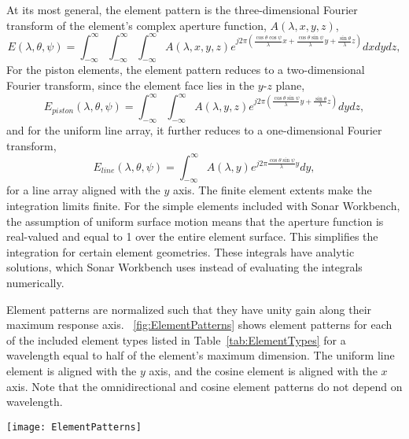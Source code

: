 At its most general, the element pattern is the three-dimensional Fourier transform of the element's complex aperture function, $A(\lambda,x,y,z)$,
\begin{equation}
E(\lambda,\theta,\psi) = \int_{-\infty}^\infty\int_{-\infty}^\infty\int_{-\infty}^\infty A(\lambda,x,y,z)e^{j2\pi\left(\frac{\cos\theta\cos\psi}{\lambda}x + \frac{\cos\theta\sin\psi}{\lambda}y + \frac{\sin\theta}{\lambda}z\right)}dxdydz,\label{eq:VolumetricFT}
\end{equation}
For the piston elements, the element pattern reduces to a two-dimensional Fourier transform, since the element face lies in the $y$-$z$ plane,
\begin{equation}
E_{piston}(\lambda,\theta,\psi) = \int_{-\infty}^\infty\int_{-\infty}^\infty A(\lambda,y,z)e^{j2\pi\left(\frac{\cos\theta\sin\psi}{\lambda}y + \frac{\sin\theta}{\lambda}z\right)}dydz,\label{eq:PlanarFT}
\end{equation}
and for the uniform line array, it further reduces to a one-dimensional Fourier transform,
\begin{equation}
E_{line}(\lambda,\theta,\psi) = \int_{-\infty}^\infty A(\lambda,y)e^{j2\pi\frac{\cos\theta\sin\psi}{\lambda}y}dy,\label{eq:LinearFT}
\end{equation}
for a line array aligned with the $y$ axis. The finite element extents make the integration limits finite. For the simple elements included with Sonar Workbench, the assumption of uniform surface motion means that the aperture function is real-valued and equal to 1 over the entire element surface. This simplifies the integration for certain element geometries. These integrals have analytic solutions, which Sonar Workbench uses instead of evaluating the integrals numerically.

Element patterns are normalized such that they have unity gain along their maximum response axis. \figurename~\ref{fig:ElementPatterns} shows element patterns for each of the included element types listed in Table~\ref{tab:ElementTypes} for a wavelength equal to half of the element's maximum dimension. The uniform line element is aligned with the $y$ axis, and the cosine element is aligned with the $x$ axis. Note that the omnidirectional and cosine element patterns do not depend on wavelength.

\begin{sidewaysfigure}[!ht]
\begin{center}
\texttt{[image: ElementPatterns]}
\caption{\label{fig:ElementPatterns}Element patterns for included element types}
\end{center}
\end{sidewaysfigure}

